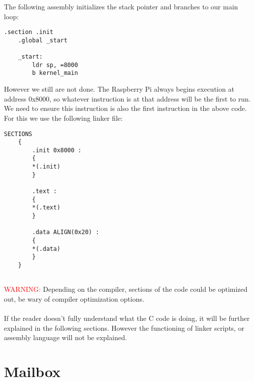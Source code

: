 \documentclass[12pt]{book}
\begin{document}
The following assembly initializes the stack pointer and branches to our main loop:
\lstset{language=ASM}
\begin{lstlisting}[style = ASM]
	.section .init
	.global _start
	
	_start:
		ldr sp, =8000
		b kernel_main
\end{lstlisting}

However we still are not done. The Raspberry Pi always begins execution at address 0x8000, so whatever instruction is at that address will be the first to run. We need to ensure this instruction is also the first instruction in the above code. For this we use the following linker file:

\lstset{language=Linker}
\begin{lstlisting}[style = C]
	SECTIONS 
	{
		.init 0x8000 : 
		{
		*(.init)
		}
		
		.text : 
		{
		*(.text)
		}
		
		.data ALIGN(0x20) : 
		{
		*(.data)
		}
	}
	
\end{lstlisting}

\textcolor{red}{WARNING:} Depending on the compiler, sections of the code could be optimized out, be wary of compiler optimization options.
\\~\\
If the reader doesn't fully understand what the C code is doing, it will be further explained in the following sections. However the functioning of linker scripts, or assembly language will not be explained.
	
\section{Mailbox}
\label{sec:mailbox}
\end{document}
